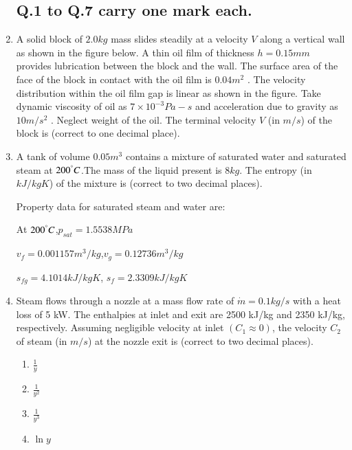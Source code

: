 \documentclass[journal]{IEEEtran}
\begin{document}
\begin{enumerate}

\subsection*{Q.1 to Q.7 carry one mark each.}

    \item A solid block of $2.0 kg$ mass slides steadily at a velocity $V$ along a vertical wall as shown in the figure below. A thin oil film of thickness $h=0.15mm$ provides lubrication between the block and the wall. The surface area of the face of the block in contact with the oil film is $0.04 m^2$ . The velocity distribution within the oil film gap is linear as shown in the figure. Take dynamic viscosity of oil as $7\times10^{-3} Pa-s$ and acceleration due to gravity as $10 m/s^2$ . Neglect weight of the oil. The terminal velocity $V$ (in $m/s$) of the block is \underline{\hspace{1cm}} (correct to one decimal place).

    \item A tank of volume $0.05 m^3$ contains a mixture of saturated water and saturated steam at $200^\degree C$.The mass of the liquid present is $8 kg$. The entropy (in $kJ/kg K$) of the mixture is \underline{\hspace{1cm}} (correct to two decimal places).

        Property data for saturated steam and water are:

        At $200^\degree C$,$p_{sat}= 1.5538 MPa$

        $v_{f} = 0.001157 m^3/kg$,$v_{g} = 0.12736 m^3/kg$

        $s_{fg} = 4.1014 kJ/kg K$, $s_{f} = 2.3309 kJ/kg K$
    
    \item Steam flows through a nozzle at a mass flow rate of $\dot{m}=0.1kg/s$ with a heat loss of 5 kW. The enthalpies at inlet and exit are 2500 kJ/kg and 2350 kJ/kg, respectively. Assuming
        negligible velocity at inlet $(C_1\approx0)$, the velocity $C_2$ of steam (in $m/s$) at the nozzle exit is \underline{\hspace{1cm}} (correct to two decimal places).
        \begin{enumerate}
            \item $\frac{1}{y}$
            \item $\frac{1}{y^2}$
            \item $\frac{1}{y^3}$
            \item $\ln{y}$
        \end{enumerate}


\end{enumerate}
\end{document}
